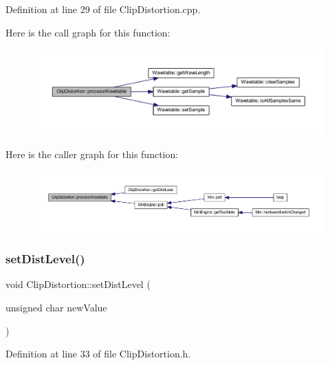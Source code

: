 Definition at line 29 of file Clip\+Distortion.\+cpp.

Here is the call graph for this function\+:
\nopagebreak
\begin{figure}[H]
\begin{center}
\leavevmode
\includegraphics[width=350pt]{d8/da2/class_clip_distortion_a761af22fbd15eb8bcc9ac0fdfe4d655d_cgraph}
\end{center}
\end{figure}
Here is the caller graph for this function\+:
\nopagebreak
\begin{figure}[H]
\begin{center}
\leavevmode
\includegraphics[width=350pt]{d8/da2/class_clip_distortion_a761af22fbd15eb8bcc9ac0fdfe4d655d_icgraph}
\end{center}
\end{figure}
\mbox{\label{class_clip_distortion_a1fe19163beb22de83c8adff0e6447bc8}} 
\subsubsection{\texorpdfstring{set\+Dist\+Level()}{setDistLevel()}}
{\footnotesize\ttfamily void Clip\+Distortion\+::set\+Dist\+Level (\begin{DoxyParamCaption}\item[{unsigned char}]{new\+Value }\end{DoxyParamCaption})\hspace{0.3cm}{\ttfamily [inline]}}



Definition at line 33 of file Clip\+Distortion.\+h.

